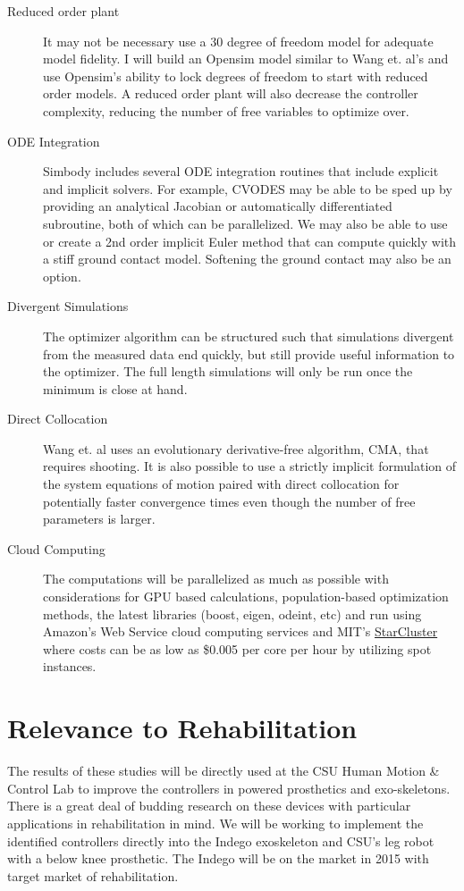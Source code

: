 \documentclass[11pt]{article}
\begin{document}
\begin{description}
  \item[Reduced order plant] It may not be necessary use a 30 degree of freedom
    model for adequate model fidelity. I will build an Opensim model similar to
    Wang et. al's and use Opensim's ability to lock degrees of freedom to start
    with reduced order models. A reduced order plant will also decrease the
    controller complexity, reducing the number of free variables to optimize
    over.
  \item[ODE Integration] Simbody includes several ODE integration routines that
    include explicit and implicit solvers. For example, CVODES may be able to
    be sped up by providing an analytical Jacobian or automatically
    differentiated subroutine, both of which can be parallelized. We may also
    be able to use or create a 2nd order implicit Euler method that can compute
    quickly with a stiff ground contact model.  Softening the ground contact
    may also be an option.
  \item[Divergent Simulations] The optimizer algorithm can be structured such
    that simulations divergent from the measured data end quickly, but still
    provide useful information to the optimizer. The full length simulations
    will only be run once the minimum is close at hand.
  \item[Direct Collocation] Wang et. al uses an evolutionary derivative-free
    algorithm, CMA, that requires shooting. It is also possible to use a
    strictly implicit formulation of the system equations of motion paired with
    direct collocation \cite{Ackermann2010} for potentially faster convergence
    times even though the number of free parameters is larger.
  \item[Cloud Computing] The computations will be parallelized as much as
    possible with considerations for GPU based calculations, population-based
    optimization methods, the latest libraries (boost, eigen, odeint, etc) and
    run using Amazon's Web Service cloud computing services and MIT's
    \href{http://star.mit.edu/cluster/}{StarCluster} where costs can be as low
    as \$0.005 per core per hour by utilizing spot instances.
\end{description}

\section*{Relevance to Rehabilitation}

The results of these studies will be directly used at the CSU Human Motion \&
Control Lab to improve the controllers in powered prosthetics and
exo-skeletons.  There is a great deal of budding research on these devices with
particular applications in rehabilitation in mind. We will be working to
implement the identified controllers directly into the Indego exoskeleton and
CSU's leg robot with a below knee prosthetic. The Indego will be on the market
in 2015 with target market of rehabilitation.
\end{document}
